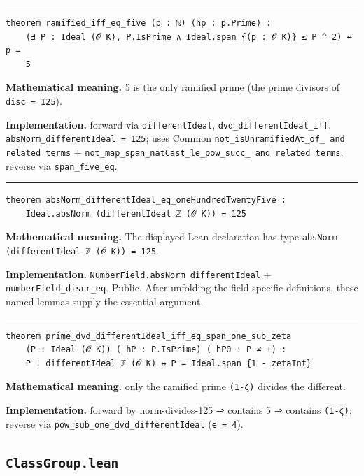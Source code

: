 \documentclass[UTF8,a4paper,11pt,fontset=fandol]{ctexart}
\theoremstyle{definition}
\newcommand{\statementsep}{\par\medskip\hrule\medskip}
\begin{document}
\statementsep
\begin{verbatim}
theorem ramified_iff_eq_five (p : ℕ) (hp : p.Prime) :
    (∃ P : Ideal (𝓞 K), P.IsPrime ∧ Ideal.span {(p : 𝓞 K)} ≤ P ^ 2) ↔ p =
    5
\end{verbatim}
\noindent\textbf{Mathematical meaning.} 5 is the only ramified prime (the prime divisors of \texttt{disc = 125}).\par
\noindent\textbf{Implementation.} forward via \texttt{differentIdeal}, \texttt{dvd\_\allowbreak{}differentIdeal\_\allowbreak{}iff}, \texttt{absNorm\_\allowbreak{}differentIdeal = 125}; uses Common \texttt{not\_\allowbreak{}isUnramifiedAt\_\allowbreak{}of\_\allowbreak{} and related terms} + \texttt{not\_\allowbreak{}map\_\allowbreak{}span\_\allowbreak{}natCast\_\allowbreak{}le\_\allowbreak{}pow\_\allowbreak{}succ\_\allowbreak{} and related terms}; reverse via \texttt{span\_\allowbreak{}five\_\allowbreak{}eq}.\par
\statementsep
\begin{verbatim}
theorem absNorm_differentIdeal_eq_oneHundredTwentyFive :
    Ideal.absNorm (differentIdeal ℤ (𝓞 K)) = 125
\end{verbatim}
\noindent\textbf{Mathematical meaning.} The displayed Lean declaration has type \texttt{absNorm (differentIdeal ℤ (𝓞 K)) = 125}.\par
\noindent\textbf{Implementation.} \texttt{NumberField.\allowbreak{}absNorm\_\allowbreak{}differentIdeal} + \texttt{numberField\_\allowbreak{}discr\_\allowbreak{}eq}. Public. After unfolding the field-specific definitions, these named lemmas supply the essential argument.\par
\statementsep
\begin{verbatim}
theorem prime_dvd_differentIdeal_iff_eq_span_one_sub_zeta
    (P : Ideal (𝓞 K)) (_hP : P.IsPrime) (_hP0 : P ≠ ⊥) :
    P ∣ differentIdeal ℤ (𝓞 K) ↔ P = Ideal.span {1 - zetaInt}
\end{verbatim}
\noindent\textbf{Mathematical meaning.} only the ramified prime \texttt{(1-ζ)} divides the different.\par
\noindent\textbf{Implementation.} forward by norm-divides-125 ⇒ contains 5 ⇒ contains \texttt{(1-ζ)}; reverse via \texttt{pow\_\allowbreak{}sub\_\allowbreak{}one\_\allowbreak{}dvd\_\allowbreak{}differentIdeal} (\texttt{e = 4}).\par

\subsection{\texttt{ClassGroup.lean}}
\end{document}
